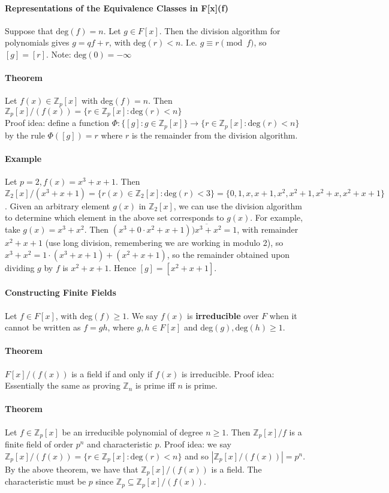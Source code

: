 \documentclass[10pt,letter]{article}
\theoremstyle{plain}
\theoremstyle{definition}
\begin{document}
\paragraph{Representations of the Equivalence Classes in F[x](f)}
Suppose that $\text{deg}(f)=n$. Let $g\in F[x]$. Then the division algorithm for polynomials gives $g=qf+r$, with $\text{deg}(r)<n$. I.e. $g\equiv r\pmod{f}$, so $[g]=[r]$. Note: $\text{deg}(0)=-\infty$ 
\paragraph{Theorem}
Let $f(x)\in\mathbb{Z}_p[x]$ with deg$(f)=n$. Then $\mathbb{Z}_p[x]/(f(x))=\{r\in\mathbb{Z}_p[x]:\text{deg}(r)<n\}$ \\ 
Proof idea: define a function $\Phi:\{[g]:g\in\mathbb{Z}_p[x]\}\rightarrow\{r\in\mathbb{Z}_p[x]:\text{deg}(r)<n\}$ by the rule $\Phi([g])=r$ where $r$ is the remainder from the division algorithm. 
\paragraph{Example}
Let $p=2,f(x)=x^3+x+1$. Then $\mathbb{Z}_2[x]/(x^3+x+1)=\{r(x)\in\mathbb{Z}_2[x]:\text{deg}(r)<3\}=\{0,1,x,x+1,x^2,x^2+1,x^2+x,x^2+x+1\}$. Given an arbitrary element $g(x)$ in $\mathbb{Z}_2[x]$, we can use the division algorithm to determine which element in the above set corresponds to $g(x)$. For example, take $g(x)=x^3+x^2$. Then $(x^3+0\cdot x^2+x+1)\overline{\big)x^3+x^2}=1$, with remainder $x^2+x+1$ (use long division, remembering we are working in modulo 2), so $x^3+x^2=1\cdot(x^3+x+1)+(x^2+x+1)$, so the remainder obtained upon dividing $g$ by $f$ is $x^2+x+1$. Hence $[g]=[x^2+x+1]$. 
\paragraph{Constructing Finite Fields}
Let $f\in F[x]$, with deg$(f)\geq1$. We say $f(x)$ is \textbf{irreducible} over $F$ when it cannot be written as $f=gh$, where $g,h\in F[x]$ and deg$(g),\text{deg}(h)\geq1$. 
\paragraph{Theorem}
$F[x]/(f(x))$ is a field if and only if $f(x)$ is irreducible. Proof idea: Essentially the same as proving $\mathbb{Z}_n$ is prime iff $n$ is prime. 
\paragraph{Theorem}
Let $f\in\mathbb{Z}_p[x]$ be an irreducible polynomial of degree $n\geq1$. Then $\mathbb{Z}_p[x]/f$ is a finite field of order $p^n$ and characteristic $p$. Proof idea: we say $\mathbb{Z}_p[x]/(f(x))=\{r\in\mathbb{Z}_p[x]:\text{deg}(r)<n\}$ and so $|\mathbb{Z}_p[x]/(f(x))|=p^n$. By the above theorem, we have that $\mathbb{Z}_p[x]/(f(x))$ is a field. The characteristic must be $p$ since $\mathbb{Z}_p\subseteq\mathbb{Z}_p[x]/(f(x))$. 
\end{document}
